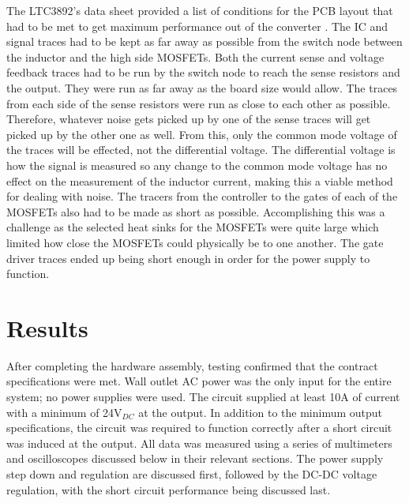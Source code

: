 \documentclass[11pt]{article}
\begin{document}
    \noindent The LTC3892's data sheet provided a list of conditions for the PCB layout that had to be met to get maximum performance out of the converter \cite{linear_technology_ltc3892:_nodate}. The IC and signal traces had to be kept as far away as possible from the switch node between the inductor and the high side MOSFETs. Both the current sense and voltage feedback traces had to be run by the switch node to reach the sense resistors and the output. They were run as far away as the board size would allow. The traces from each side of the sense resistors were run as close to each other as possible. Therefore, whatever noise gets picked up by one of the sense traces will get picked up by the other one as well. From this, only the common mode voltage of the traces will be effected, not the differential voltage. The differential voltage is how the signal is measured so any change to the common mode voltage has no effect on the measurement of the inductor current, making this a viable method for dealing with noise.  
    \newline
    \newline
    \noindent The tracers from the controller to the gates of each of the MOSFETs also had to be made as short as possible. Accomplishing this was a challenge as the selected heat sinks for the MOSFETs were quite large which limited how close the MOSFETs could physically be to one another. The gate driver traces ended up being short enough in order for the power supply to function.
    
\section{Results}
    After completing the hardware assembly, testing confirmed that the contract specifications were met. Wall outlet AC power was the only input for the entire system; no power supplies were used. The circuit supplied at least 10A of current with a minimum of 24V$_{DC}$ at the output. In addition to the minimum output specifications, the circuit was required to function correctly after a short circuit was induced at the output. All data was measured using a series of multimeters and oscilloscopes discussed below in their relevant sections. The power supply step down and regulation are discussed first, followed by the DC-DC voltage regulation, with the short circuit performance being discussed last. 
    
\end{document}
